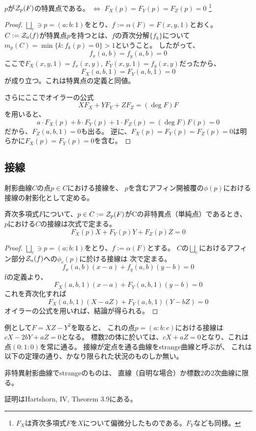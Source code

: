 \documentclass[a4paper]{jsarticle}
\begin{document}
    \begin{Lemma}
        $p$が$\mathcal{Z}_p(F)$の特異点である。
        $\iff$ $F_X(p)=F_Y(p)=F_Z(p)=0$
        \footnote{$F_X$は斉次多項式$F$を$X$について偏微分したものである。$F_Y$なども同様。}
    \end{Lemma}
    \begin{proof}
        $\bigsqcup_c \ni p=(a:b:1)$をとり、$f:=\alpha(F)=F(x, y, 1)$とおく。
        $C:=\mathcal{Z}_a(f)$が特異点$p$を持つとは、$f$の斉次分解$\{ f_k \}$について
        $m_p(C)=\min\{k : f_k(p)=0\}>1$ということ。
        したがって、
        \[ f_x(a,b)=f_y(a,b)=0 \]
        ここで$F_X(x, y, 1)=f_x(x,y)$, $F_Y(x, y, 1)=f_y(x,y)$だったから、
        \[ F_X(a, b, 1)=F_Y(a, b, 1)=0 \]
        が成り立つ。これは特異点の定義と同値。

        さらにここでオイラーの公式\[ XF_X+YF_Y+ZF_Z=(\deg F)F \]を用いると、
        \[ a \cdot F_X(p)+b \cdot F_Y(p)+1 \cdot F_Z(p)=(\deg F)F(p)=0 \]
        だから、$F_Z(a, b, 1)=0$も出る。
        逆に、$F_X(p)=F_Y(p)=F_Z(p)=0$は明らかに$F_X(p)=F_Y(p)=0$を含む。
        
    \end{proof}

    \subsection{接線}
    \begin{Def}[射影曲線の接線]
        射影曲線$C$の点$p \in C$における接線を、
        $p$を含むアフィン開被覆の$\phi(p)$における接線の射影化として定める。
    \end{Def}

    \begin{Lemma}
        斉次多項式$F$について、$p \in C:=\mathcal{Z}_p(F)$がCの非特異点（単純点）であるとき、
        $p$における$C$の接線は次式で定まる。
        \[ F_X(p)X+F_Y(p)Y+F_Z(p)Z=0 \]
    \end{Lemma}
    \begin{proof}
        $\bigsqcup_c \ni p=(a:b:1)$をとり、$f:=\alpha(F)$とする。
        $C$の$\bigsqcup_c$におけるアフィン部分$\mathcal{Z}_a(f)$への$\phi_c(p)$に於ける接線は
        次で定まる。
        \[ f_x(a,b)(x-a)+f_y(a,b)(y-b)=0 \]
        fの定義より、
        \[ F_X(a,b,1)(x-a)+F_Y(a,b,1)(y-b)=0 \]
        これを斉次化すれば
        \[ F_X(a,b,1)(X-aZ)+F_Y(a,b,1)(Y-bZ)=0 \]
        オイラーの公式を用いれば、結論が得られる。
    \end{proof}

    例として$F=XZ-Y^2$を取ると、
    これの点$p=(a:b:c)$における接線は$cX-2bY+aZ=0$となる。
    標数2の体に於いては、$cX+aZ=0$となり、これは点$(0:1:0)$を常に通る。
    接線が定点を通る曲線をstrange曲線と呼ぶが、
    これは以下の定理の通り、かなり限られた状況のものしか無い。
    \begin{Them}[Samuel]
        非特異射影曲線でstrangeのものは、
        直線（自明な場合）か標数2の2次曲線に限る。
    \end{Them}
    証明はHartshorn, IV, Theorem 3.9にある。
\end{document}
